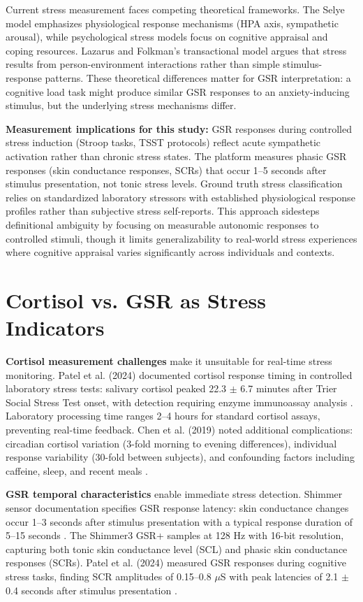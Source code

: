 Current stress measurement faces competing theoretical frameworks. The Selye model emphasizes physiological response mechanisms (HPA axis, sympathetic arousal), while psychological stress models focus on cognitive appraisal and coping resources. Lazarus and Folkman's transactional model argues that stress results from person-environment interactions rather than simple stimulus-response patterns. These theoretical differences matter for GSR interpretation: a cognitive load task might produce similar GSR responses to an anxiety-inducing stimulus, but the underlying stress mechanisms differ.

\textbf{Measurement implications for this study:} GSR responses during controlled stress induction (Stroop tasks, TSST protocols) reflect acute sympathetic activation rather than chronic stress states. The platform measures phasic GSR responses (skin conductance responses, SCRs) that occur 1--5 seconds after stimulus presentation, not tonic stress levels. Ground truth stress classification relies on standardized laboratory stressors with established physiological response profiles rather than subjective stress self-reports. This approach sidesteps definitional ambiguity by focusing on measurable autonomic responses to controlled stimuli, though it limits generalizability to real-world stress experiences where cognitive appraisal varies significantly across individuals and contexts.

\section{Cortisol vs. GSR as Stress Indicators}
\textbf{Cortisol measurement challenges} make it unsuitable for real-time stress monitoring. Patel et al. (2024) documented cortisol response timing in controlled laboratory stress tests: salivary cortisol peaked 22.3 $\pm$ 6.7 minutes after Trier Social Stress Test onset, with detection requiring enzyme immunoassay analysis \cite{ref7}. Laboratory processing time ranges 2--4 hours for standard cortisol assays, preventing real-time feedback. Chen et al. (2019) noted additional complications: circadian cortisol variation (3-fold morning to evening differences), individual response variability (30-fold between subjects), and confounding factors including caffeine, sleep, and recent meals \cite{ref4}.

\textbf{GSR temporal characteristics} enable immediate stress detection. Shimmer sensor documentation specifies GSR response latency: skin conductance changes occur 1--3 seconds after stimulus presentation with a typical response duration of 5--15 seconds \cite{ref8}. The Shimmer3 GSR+ samples at 128 Hz with 16-bit resolution, capturing both tonic skin conductance level (SCL) and phasic skin conductance responses (SCRs). Patel et al. (2024) measured GSR responses during cognitive stress tasks, finding SCR amplitudes of 0.15--0.8 $\mu$S with peak latencies of 2.1 $\pm$ 0.4 seconds after stimulus presentation \cite{ref7}.

